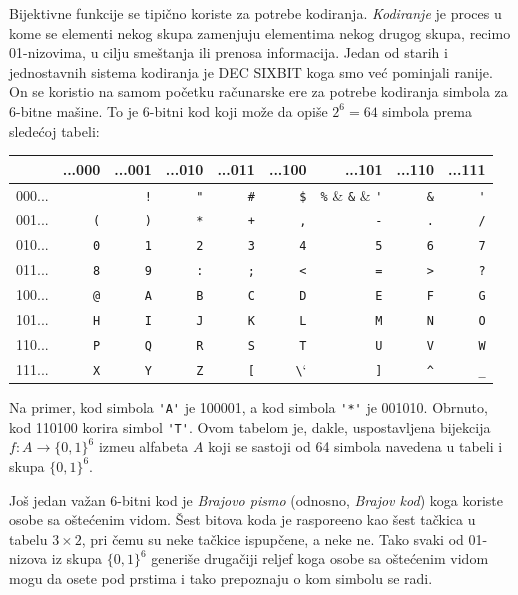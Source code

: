 \begin{EX}\label{ft08.ex.DEC-SIXBIT}
  Bijektivne funkcije se tipi\v cno koriste za potrebe kodiranja. \emph{Kodiranje} je proces u kome se
  elementi nekog skupa zamenjuju elementima nekog drugog skupa, recimo 01-nizovima, u cilju sme\v stanja ili
  prenosa informacija. Jedan od starih i jednostavnih sistema kodiranja je DEC SIXBIT koga smo ve\'c pominjali
  ranije. On se koristio na samom po\v cetku ra\v cunarske ere za potrebe kodiranja simbola za 6-bitne ma\v sine.
  To je 6-bitni kod koji mo\v ze da opi\v se $2^6 = 64$ simbola prema slede\'coj tabeli:
  \begin{center}
    \begin{tabular}{r|rrrrrrrr}
             & ...000    & ...001   & ...010   & ...011   & ...100   & ...101   & ...110   & ...111  \\
      \hline
      000... & \verb*` ` & \verb`!` & \verb`"` & \verb`#` & \verb`$` & \verb`%` & \verb`&` & \verb`'`\\
      001... & \verb`(`  & \verb`)` & \verb`*` & \verb`+` & \verb`,` & \verb`-` & \verb`.` & \verb`/`\\
      010... & \verb`0`  & \verb`1` & \verb`2` & \verb`3` & \verb`4` & \verb`5` & \verb`6` & \verb`7`\\
      011... & \verb`8`  & \verb`9` & \verb`:` & \verb`;` & \verb`<` & \verb`=` & \verb`>` & \verb`?`\\
      100... & \verb`@`  & \verb`A` & \verb`B` & \verb`C` & \verb`D` & \verb`E` & \verb`F` & \verb`G`\\
      101... & \verb`H`  & \verb`I` & \verb`J` & \verb`K` & \verb`L` & \verb`M` & \verb`N` & \verb`O`\\
      110... & \verb`P`  & \verb`Q` & \verb`R` & \verb`S` & \verb`T` & \verb`U` & \verb`V` & \verb`W`\\
      111... & \verb`X`  & \verb`Y` & \verb`Z` & \verb`[` & \verb`\` & \verb`]` & \verb`^` & \verb`_`
    \end{tabular}
  \end{center}
  Na primer, kod simbola \verb`'A'` je 100001, a kod simbola \verb`'*'` je 001010.
  Obrnuto, kod 110100 korira simbol \verb`'T'`. Ovom tabelom je, dakle, uspostavljena bijekcija
  $f : A \to \{0,1\}^6$ izme\dj u alfabeta $A$ koji se sastoji od 64 simbola navedena u tabeli
  i skupa $\{0,1\}^6$.
  
  Jo\v s jedan va\v zan 6-bitni kod je \emph{Brajovo pismo} (odnosno, \emph{Brajov kod}) koga koriste osobe sa o\v ste\'cenim vidom.
  \v Sest bitova koda je raspore\dj eno kao \v sest ta\v ckica u tabelu $3 \times 2$, pri \v cemu su neke ta\v ckice
  ispup\v cene, a neke ne. Tako svaki od 01-nizova iz skupa $\{0, 1\}^6$ generi\v se druga\v ciji reljef koga osobe
  sa o\v ste\'cenim vidom mogu da osete pod prstima i tako prepoznaju o kom simbolu se radi.
\end{EX}

